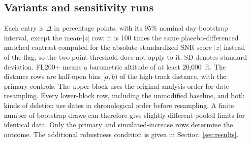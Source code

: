 \documentclass[11pt]{article}
\begin{document}
\begin{appendices}
\section{Variants and sensitivity runs}\label{app:variants}
Each entry is $\Delta$ in percentage points, with its 95\% nominal day-bootstrap interval, except the mean-$|z|$ row: it is 100 times the same placebo-differenced matched contrast computed for the absolute standardized SNR score $|z|$ instead of the flag, so the two-point threshold does not apply to it. SD denotes standard deviation. FL200+ means a barometric altitude of at least 20{,}000~ft. The distance rows are half-open bins $[a,b)$ of the high-track distance, with the primary controls. The upper block uses the original analysis order for date resampling. Every lower-block row, including the unmodified baseline, and both kinds of deletion use dates in chronological order before resampling. A finite number of bootstrap draws can therefore give slightly different pooled limits for identical data. Only the primary and simulated-increase rows determine the outcome. The additional robustness condition is given in Section~\ref{sec:results}.


\end{appendices}
\end{document}
